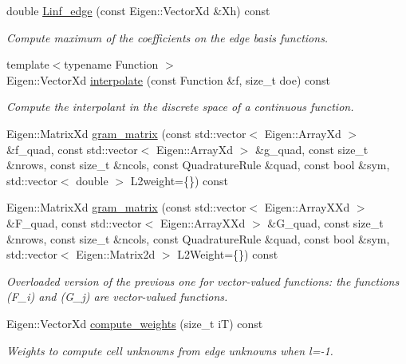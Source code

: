 \begin{DoxyCompactItemize}
double \hyperlink{classHArDCore2D_1_1HybridCore_ac8878fba08f008f5ecbaa69a9a084904}{Linf\+\_\+edge} (const Eigen\+::\+Vector\+Xd \&Xh) const
\begin{DoxyCompactList}\small\item\em Compute maximum of the coefficients on the edge basis functions. \end{DoxyCompactList}\item 
{\footnotesize template$<$typename Function $>$ }\\Eigen\+::\+Vector\+Xd \hyperlink{group__HybridCore_ga71c953efc96f467cb24faa1b60ee9bb2}{interpolate} (const Function \&f, size\+\_\+t doe) const
\begin{DoxyCompactList}\small\item\em Compute the interpolant in the discrete space of a continuous function. \end{DoxyCompactList}\item 
Eigen\+::\+Matrix\+Xd \hyperlink{classHArDCore2D_1_1HybridCore_aa5c203c11a661933930a33335b0e2479}{gram\+\_\+matrix} (const std\+::vector$<$ Eigen\+::\+Array\+Xd $>$ \&f\+\_\+quad, const std\+::vector$<$ Eigen\+::\+Array\+Xd $>$ \&g\+\_\+quad, const size\+\_\+t \&nrows, const size\+\_\+t \&ncols, const Quadrature\+Rule \&quad, const bool \&sym, std\+::vector$<$ double $>$ L2weight=\{\}) const
\item 
Eigen\+::\+Matrix\+Xd \hyperlink{classHArDCore2D_1_1HybridCore_a9d7cab97f874ee1c6debab251400d7a7}{gram\+\_\+matrix} (const std\+::vector$<$ Eigen\+::\+Array\+X\+Xd $>$ \&F\+\_\+quad, const std\+::vector$<$ Eigen\+::\+Array\+X\+Xd $>$ \&G\+\_\+quad, const size\+\_\+t \&nrows, const size\+\_\+t \&ncols, const Quadrature\+Rule \&quad, const bool \&sym, std\+::vector$<$ Eigen\+::\+Matrix2d $>$ L2\+Weight=\{\}) const
\begin{DoxyCompactList}\small\item\em Overloaded version of the previous one for vector-\/valued functions\+: the functions (F\+\_\+i) and (G\+\_\+j) are vector-\/valued functions. \end{DoxyCompactList}\item 
\mbox{\label{classHArDCore2D_1_1HybridCore_a06825c5d156026d465a2798389aa952b}} 
Eigen\+::\+Vector\+Xd \hyperlink{classHArDCore2D_1_1HybridCore_a06825c5d156026d465a2798389aa952b}{compute\+\_\+weights} (size\+\_\+t iT) const
\begin{DoxyCompactList}\small\item\em Weights to compute cell unknowns from edge unknowns when l=-\/1. \end{DoxyCompactList}\item 

\end{DoxyCompactItemize}
